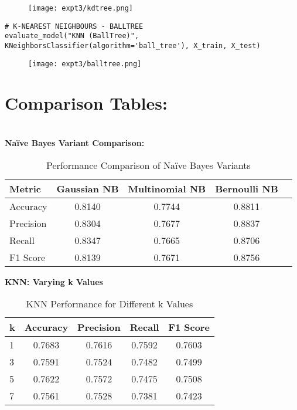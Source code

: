 \documentclass[11pt]{article}
\begin{document}
\begin{figure}[H]
\centering
\texttt{[image: expt3/kdtree.png]} 
\end{figure}

\begin{verbatim}
# K-NEAREST NEIGHBOURS - BALLTREE
evaluate_model("KNN (BallTree)", KNeighborsClassifier(algorithm='ball_tree'), X_train, X_test)
\end{verbatim}

\begin{figure}[H]
\centering
\texttt{[image: expt3/balltree.png]} 
\end{figure}

\noindent
\section{Comparison Tables:} \\
\vspace{0.5cm}
\textbf{Naïve Bayes Variant Comparison:} \\
\begin{table}[h!]
\centering
\begin{tabular}{|l|c|c|c|c|}
\hline
\textbf{Metric} & \textbf{Gaussian NB} & \textbf{Multinomial NB} & \textbf{Bernoulli NB}\\
\hline
Accuracy & 0.8140 & 0.7744 & 0.8811 \\
Precision & 0.8304 & 0.7677 & 0.8837 \\
Recall & 0.8347 & 0.7665 & 0.8706 \\
F1 Score & 0.8139 & 0.7671 & 0.8756 \\
\hline
\end{tabular}
\caption{Performance Comparison of Naïve Bayes Variants}
\end{table}

\vspace{0.5cm}
\noindent
\textbf{KNN: Varying k Values} \\
\begin{table}[h!]
\centering
\begin{tabular}{|l|c|c|c|c|}
\hline
\textbf{k} & \textbf{Accuracy} & \textbf{Precision} & \textbf{Recall} & \textbf{F1 Score}\\
\hline
1 & 0.7683 & 0.7616 & 0.7592 & 0.7603 \\
3 & 0.7591 & 0.7524 & 0.7482 & 0.7499 \\
5 & 0.7622 & 0.7572 & 0.7475 & 0.7508 \\
7 & 0.7561 & 0.7528 & 0.7381 & 0.7423 \\
\hline
\end{tabular}
\caption{KNN Performance for Different k Values}
\end{table}
\end{document}
